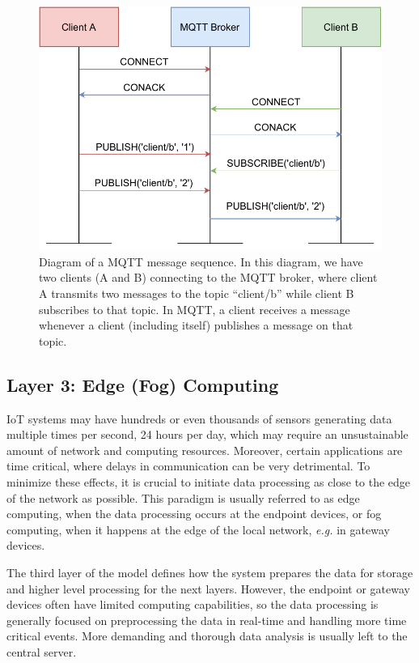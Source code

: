 \begin{figure}[H]
    \centering
    \includegraphics[width=0.75\linewidth]{images/mqtt message sequence diagram.pdf}
    \caption[Diagram of a \acs{MQTT} message sequence.]{ Diagram of a \acs{MQTT} message sequence. In this diagram, we have two clients (A and B) connecting to the \acs{MQTT} broker, where client A transmits two messages to the topic ``client/b'' while client B subscribes to that topic. In \acs{MQTT}, a client receives a message whenever a client (including itself) publishes a message on that topic.}
    \label{fig:mqtt-message-sequence-diagram}
\end{figure}

\subsection{Layer 3: Edge (Fog) Computing}
\label{sec:iot-model-layer3}

\acs{IoT} systems may have hundreds or even thousands of sensors generating data multiple times per second, 24 hours per day, which may require an unsustainable amount of network and computing resources. Moreover, certain applications are time critical, where delays in communication can be very detrimental. To minimize these effects, it is crucial to initiate data processing as close to the edge of the network as possible. This paradigm is usually referred to as edge computing, when the data processing occurs at the endpoint devices, or fog computing, when it happens at the edge of the local network, \textit{e.g.} in gateway devices. \bigskip

The third layer of the model defines how the system prepares the data for storage and higher level processing for the next layers. However, the endpoint or gateway devices often have limited computing capabilities, so the data processing is generally focused on preprocessing the data in real-time and handling more time critical events. More demanding and thorough data analysis is usually left to the central server. \bigskip

